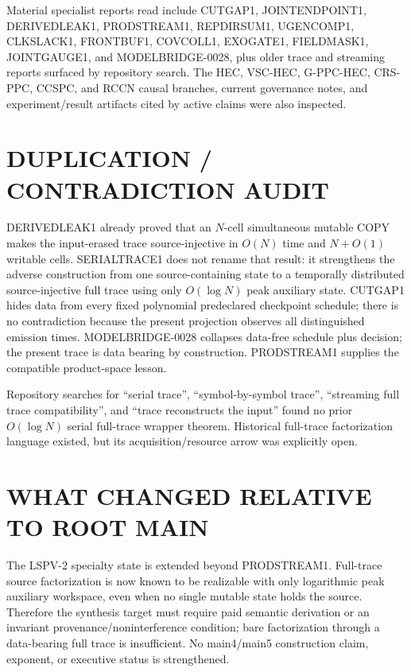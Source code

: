 \documentclass[11pt]{article}
\begin{document}
Material specialist reports read include CUTGAP1, JOINTENDPOINT1,
DERIVEDLEAK1, PRODSTREAM1, REPDIRSUM1, UGENCOMP1, CLKSLACK1, FRONTBUF1,
COVCOLL1, EXOGATE1, FIELDMASK1, JOINTGAUGE1, and MODELBRIDGE-0028, plus older
trace and streaming reports surfaced by repository search.  The HEC,
VSC-HEC, G-PPC-HEC, CRS-PPC, CCSPC, and RCCN causal branches, current
governance notes, and experiment/result artifacts cited by active claims were
also inspected.

\section{DUPLICATION / CONTRADICTION AUDIT}

DERIVEDLEAK1 already proved that an $N$-cell simultaneous mutable COPY makes
the input-erased trace source-injective in $O(N)$ time and $N+O(1)$ writable
cells.  SERIALTRACE1 does not rename that result: it strengthens the adverse
construction from one source-containing state to a temporally distributed
source-injective full trace using only $O(\log N)$ peak auxiliary state.
CUTGAP1 hides data from every fixed polynomial predeclared checkpoint
schedule; there is no contradiction because the present projection observes
all distinguished emission times.  MODELBRIDGE-0028 collapses data-free
schedule plus decision; the present trace is data bearing by construction.
PRODSTREAM1 supplies the compatible product-space lesson.

Repository searches for ``serial trace'', ``symbol-by-symbol trace'',
``streaming full trace compatibility'', and ``trace reconstructs the input''
found no prior $O(\log N)$ serial full-trace wrapper theorem.  Historical
full-trace factorization language existed, but its acquisition/resource arrow
was explicitly open.

\section{WHAT CHANGED RELATIVE TO ROOT MAIN}

The LSPV-2 specialty state is extended beyond PRODSTREAM1.  Full-trace source
factorization is now known to be realizable with only logarithmic peak
auxiliary workspace, even when no single mutable state holds the source.
Therefore the synthesis target must require paid semantic derivation or an
invariant provenance/noninterference condition; bare factorization through a
data-bearing full trace is insufficient.  No main4/main5 construction claim,
exponent, or executive status is strengthened.
\end{document}
